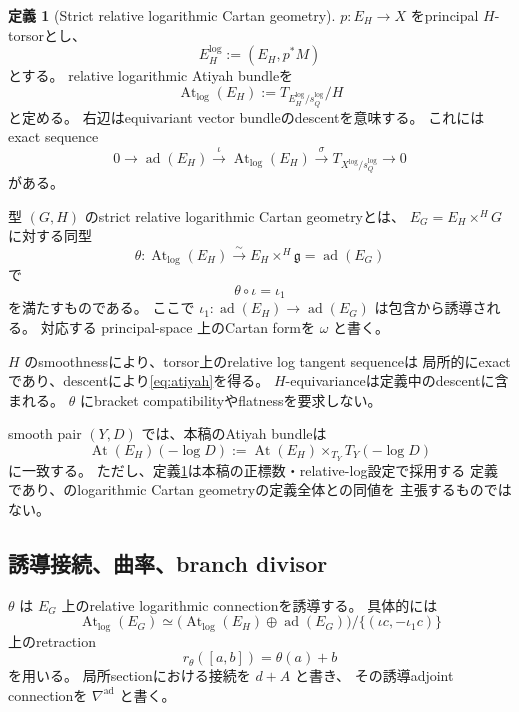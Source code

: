 \documentclass[uplatex,dvipdfmx,11pt]{jsarticle}
\numberwithin{equation}{section}
\theoremstyle{plain}
\theoremstyle{definition}
\newtheorem{definition}[theorem]{定義}
\theoremstyle{remark}
\DeclareMathOperator{\At}{At}
\DeclareMathOperator{\ad}{ad}
\newcommand{\g}{\mathfrak g}
\newcommand{\Tlog}{T_{X^{\log}/s_Q^{\log}}}
\newcommand{\Atlog}{\At_{\log}}
\newcommand{\nablaad}{\nabla^{\mathrm{ad}}}
\begin{document}
\begin{definition}[Strict relative logarithmic Cartan geometry]
\label{def:strict-log-cartan}
\(p:E_H\to X\) をprincipal \(H\)-torsorとし、
\[
E_H^{\log}:=(E_H,p^*M)
\]
とする。
relative logarithmic Atiyah bundleを
\[
\Atlog(E_H):=T_{E_H^{\log}/s_Q^{\log}}/H
\]
と定める。
右辺はequivariant vector bundleのdescentを意味する。
これにはexact sequence
\begin{equation}
\label{eq:atiyah}
0\longrightarrow\ad(E_H)
\xrightarrow{\iota}\Atlog(E_H)
\xrightarrow{\ \sigma\ }\Tlog\longrightarrow0
\end{equation}
がある。

型 \((G,H)\) のstrict relative logarithmic Cartan geometryとは、
\(E_G=E_H\times^H G\) に対する同型
\begin{equation}
\label{eq:strict-cartan}
\theta:\Atlog(E_H)\xrightarrow{\sim}
E_H\times^H\g=\ad(E_G)
\end{equation}
で
\[
\theta\circ\iota=\iota_1
\]
を満たすものである。
ここで \(\iota_1:\ad(E_H)\to\ad(E_G)\) は包含から誘導される。
対応する principal-space 上のCartan formを \(\omega\) と書く。
\end{definition}

\(H\) のsmoothnessにより、torsor上のrelative log tangent sequenceは
局所的にexactであり、descentにより\eqref{eq:atiyah}を得る。
\(H\)-equivarianceは定義中のdescentに含まれる。
\(\theta\) にbracket compatibilityやflatnessを要求しない。

smooth pair \((Y,D)\) では、本稿のAtiyah bundleは
\[
\At(E_H)(-\log D)
:=
\At(E_H)\times_{T_Y}T_Y(-\log D)
\]
に一致する。
ただし、定義\ref{def:strict-log-cartan}は本稿の正標数・relative-log設定で採用する
定義であり、\cite{BDM}のlogarithmic Cartan geometryの定義全体との同値を
主張するものではない。

\subsection{誘導接続、曲率、branch divisor}

\(\theta\) は \(E_G\) 上のrelative logarithmic connectionを誘導する。
具体的には
\[
\Atlog(E_G)
\simeq
\bigl(\Atlog(E_H)\oplus\ad(E_G)\bigr)/
\{(\iota c,-\iota_1c)\}
\]
上のretraction
\begin{equation}
\label{eq:induced-connection}
r_\theta([a,b])=\theta(a)+b
\end{equation}
を用いる。
局所sectionにおける接続を \(d+A\) と書き、
その誘導adjoint connectionを \(\nablaad\) と書く。
\end{document}
